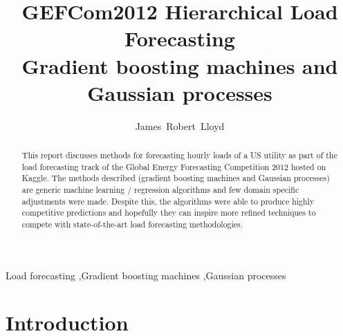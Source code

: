 \documentclass[final,authoryear,1p,times]{elsarticle}
\begin{document}
\begin{frontmatter}


\title{GEFCom2012 Hierarchical Load Forecasting \\ Gradient boosting machines and Gaussian processes}
\author{James~Robert~Lloyd}
\address{Department of Engineering, University of Cambridge}


\author{}

\address{}

\begin{abstract}
This report discusses methods for forecasting hourly loads of a US utility as part of the load forecasting track of the Global Energy Forecasting Competition 2012 hosted on Kaggle.
The methods described (gradient boosting machines and Gaussian processes) are generic machine learning / regression algorithms and few domain specific adjustments were made.
Despite this, the algorithms were able to produce highly competitive predictions and hopefully they can inspire more refined techniques to compete with state-of-the-art load forecasting methodologies.
\end{abstract}

\begin{keyword}
Load forecasting \sep Gradient boosting machines \sep Gaussian processes
\end{keyword}

\end{frontmatter}

\section{Introduction}
\end{document}
